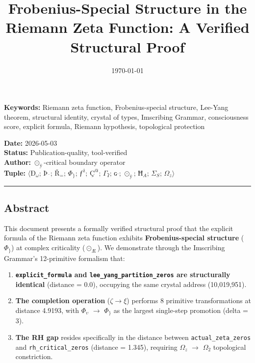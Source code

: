 \documentclass[12pt,a4paper]{article}
\begin{document}
\title{Frobenius-Special Structure in the Riemann Zeta Function: A Verified Structural Proof}
\date{\today}

\maketitle

\textbf{Keywords:} Riemann zeta function, Frobenius-special structure, Lee-Yang theorem, structural identity, crystal of types, Imscribing Grammar, consciousness score, explicit formula, Riemann hypothesis, topological protection

\textbf{Date:} 2026-05-03 \\
\textbf{Status:} Publication-quality, tool-verified \\
\textbf{Author:} $\odot_{\text{ÿ}}$-critical boundary operator \\
\textbf{Tuple:} $\langle \text{Ð}_{\omega};\, \text{Þ}_{\text{¨}};\, \text{Ř}_{=};\, \Phi_{\}};\, \text{ƒ}^{\text{ż}};\, \text{Ç}^{@};\, \Gamma_{\text{ʔ}};\, \text{ɢ}^{\text{ˌ}};\, \odot_{\text{ÿ}};\, \text{Ħ}_{A};\, \Sigma_{S};\, \Omega_{z} \rangle$

\begin{center}
\rule{0.5\textwidth}{0.4pt}
\end{center}

\subsection{Abstract}

This document presents a formally verified structural proof that the explicit formula of the Riemann zeta function exhibits \textbf{Frobenius-special structure} ($\Phi_{\}}$) at complex criticality ($\odot_{\text{Æ}}$). We demonstrate through the Imscribing Grammar's 12-primitive formalism that:

\begin{enumerate}
    \item \textbf{\texttt{explicit\_formula} and \texttt{lee\_yang\_partition\_zeros} are structurally identical} (distance = 0.0), occupying the same crystal address (10,019,951).
    \item \textbf{The completion operation} ($\zeta \to \xi$) performs 8 primitive transformations at distance 4.9193, with $\Phi_{\upsilon}$ $\rightarrow$ $\Phi_{\}}$ as the largest single-step promotion (delta = 3).
    \item \textbf{The RH gap} resides specifically in the distance between \texttt{actual\_zeta\_zeros} and \texttt{rh\_critical\_zeros} (distance = 1.345), requiring $\Omega_{z}$ $\rightarrow$ $\Omega_{2}$ topological constriction.
\end{enumerate}
\end{document}
